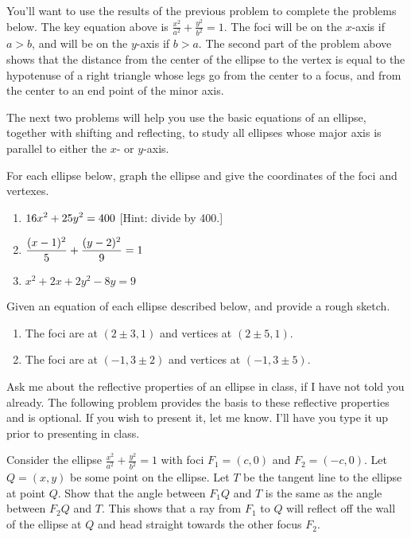 You'll want to use the results of the previous problem to complete the problems below. The key equation above is $\frac{x^2}{a^2}+\frac{y^2}{b^2}=1$. The foci will be on the $x$-axis if $a>b$, and will be on the $y$-axis if $b>a$. The second part of the problem above shows that the distance from the center of the ellipse to the vertex is equal to the hypotenuse of a right triangle whose legs go from the center to a focus, and from the center to an end point of the minor axis. 

The next two problems will help you use the basic equations of an ellipse, together with shifting and reflecting, to study all ellipses whose major axis is parallel to either the $x$- or $y$-axis. 

\begin{problem}  
For each ellipse below, graph the ellipse and give the coordinates of the foci and vertexes. \begin{enumerate}
\item $\displaystyle 16x^2+25y^2=400$ [Hint: divide by 400.]
\item $\displaystyle \frac{(x-1)^2}{5}+\frac{(y-2)^2}{9}=1$
\item $x^2+2x+2y^2-8y=9$
\end{enumerate}
\end{problem}

\begin{problem} 
Given an equation of each ellipse described below, and provide a rough sketch.
\begin{enumerate}
\item The foci are at $(2\pm 3,1)$ and vertices at $(2\pm 5, 1)$.
\item The foci are at $(-1,3\pm 2)$ and vertices at $(-1, 3\pm 5)$.
\end{enumerate}
\end{problem}

Ask me about the reflective properties of an ellipse in class, if I have not told you already. The following problem provides the basis to these reflective properties and is optional.  If you wish to present it, let me know. I'll have you type it up prior to presenting in class.

\begin{problem}[Optional]
Consider the ellipse $\frac{x^2}{a^2}+\frac{y^2}{b^2}=1$ with foci $F_1=(c,0)$ and $F_2=(-c,0)$. 
Let $Q=(x,y)$ be some point on the ellipse. 
Let $T$ be the tangent line to the ellipse at point $Q$. 
Show that the angle between $F_1Q$ and $T$ is the same as the angle between $F_2Q$ and $T$. This shows that a ray from $F_1$ to $Q$ will reflect off the wall of the ellipse at $Q$ and head straight towards the other focus $F_2$.
\end{problem}


